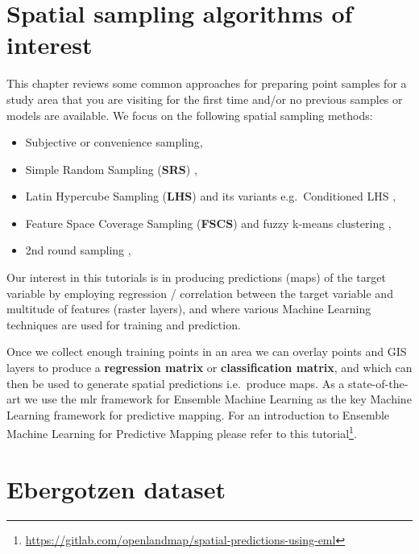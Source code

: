 \documentclass[
  graybox,natbib,nospthms]{svmono}
\providecommand{\tightlist}{%
  \setlength{\itemsep}{0pt}\setlength{\parskip}{0pt}}
\providecommand{\tightlist}{\setlength{\itemsep}{0pt}\setlength{\parskip}{0pt}}
\renewcommand{\href}[2]{#2 (\url{#1})}
\renewcommand{\href}[2]{#2\footnote{\url{#1}}}
\begin{document}
\hypertarget{spatial-sampling-algorithms-of-interest}{%
\section{Spatial sampling algorithms of interest}\label{spatial-sampling-algorithms-of-interest}}

This chapter reviews some common approaches for preparing point samples for a
study area that you are visiting for the first time and/or no previous samples or
models are available. We focus on the following spatial sampling methods:

\begin{itemize}
\tightlist
\item
  Subjective or convenience sampling,
\item
  Simple Random Sampling (\textbf{SRS}) \citep{Bivand2013Springer, Brus2021sampling},
\item
  Latin Hypercube Sampling (\textbf{LHS}) and its variants e.g.~Conditioned LHS \citep{minasny2006conditioned, Malone2019PeerJ},
\item
  Feature Space Coverage Sampling (\textbf{FSCS}) \citep{Goerg2013} and fuzzy k-means clustering \citep{hastie2009elements},
\item
  2nd round sampling \citep{stumpf2017uncertainty},
\end{itemize}

Our interest in this tutorials is in producing predictions (maps) of the target
variable by employing regression / correlation between the target variable and
multitude of features (raster layers), and where various Machine Learning techniques
are used for training and prediction.

Once we collect enough training points in an area we can overlay points and GIS
layers to produce a \textbf{regression matrix} or \textbf{classification matrix}, and
which can then be used to generate spatial predictions i.e.~produce maps. As a
state-of-the-art we use the mlr framework for Ensemble Machine Learning as the key
Machine Learning framework for predictive mapping. For an introduction to Ensemble
Machine Learning for Predictive Mapping please refer to \href{https://gitlab.com/openlandmap/spatial-predictions-using-eml}{this tutorial}.

\hypertarget{ebergotzen-dataset}{%
\section{Ebergotzen dataset}\label{ebergotzen-dataset}}
\end{document}
